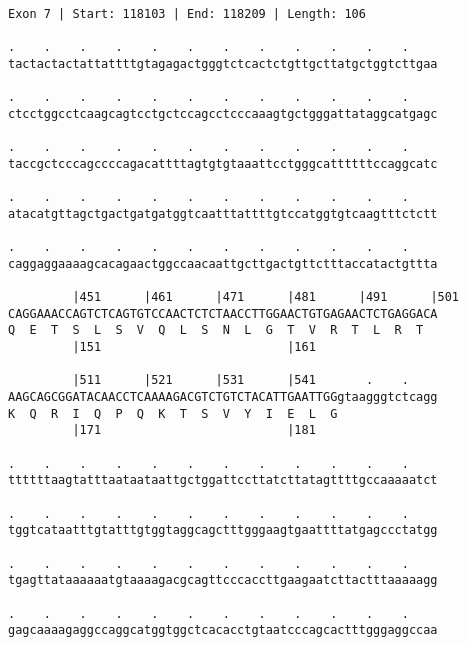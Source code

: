 \documentclass{article}
\begin{document}
\begin{Verbatim}
Exon 7 | Start: 118103 | End: 118209 | Length: 106
 
.    .    .    .    .    .    .    .    .    .    .    .    
tactactactattattttgtagagactgggtctcactctgttgcttatgctggtcttgaa
                                                            
.    .    .    .    .    .    .    .    .    .    .    .    
ctcctggcctcaagcagtcctgctccagcctcccaaagtgctgggattataggcatgagc
                                                            
.    .    .    .    .    .    .    .    .    .    .    .    
taccgctcccagccccagacattttagtgtgtaaattcctgggcattttttccaggcatc
                                                            
.    .    .    .    .    .    .    .    .    .    .    .    
atacatgttagctgactgatgatggtcaatttattttgtccatggtgtcaagtttctctt
                                                            
.    .    .    .    .    .    .    .    .    .    .    .    
caggaggaaaagcacagaactggccaacaattgcttgactgttctttaccatactgttta
                                                            
         |451      |461      |471      |481      |491      |501
CAGGAAACCAGTCTCAGTGTCCAACTCTCTAACCTTGGAACTGTGAGAACTCTGAGGACA
Q  E  T  S  L  S  V  Q  L  S  N  L  G  T  V  R  T  L  R  T  
         |151                          |161                 
  
         |511      |521      |531      |541       .    .    
AAGCAGCGGATACAACCTCAAAAGACGTCTGTCTACATTGAATTGGgtaagggtctcagg
K  Q  R  I  Q  P  Q  K  T  S  V  Y  I  E  L  G              
         |171                          |181                 
  
.    .    .    .    .    .    .    .    .    .    .    .    
ttttttaagtatttaataataattgctggattccttatcttatagttttgccaaaaatct
                                                            
.    .    .    .    .    .    .    .    .    .    .    .    
tggtcataatttgtatttgtggtaggcagctttgggaagtgaattttatgagccctatgg
                                                            
.    .    .    .    .    .    .    .    .    .    .    .    
tgagttataaaaaatgtaaaagacgcagttcccaccttgaagaatcttactttaaaaagg
                                                            
.    .    .    .    .    .    .    .    .    .    .    .    
gagcaaaagaggccaggcatggtggctcacacctgtaatcccagcactttgggaggccaa
                                                            

\end{Verbatim}
\end{document}

